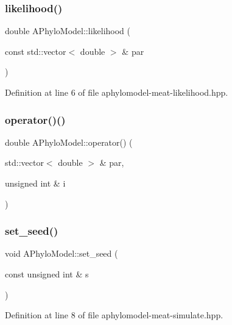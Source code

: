 \subsubsection{\texorpdfstring{likelihood()}{likelihood()}}
{\footnotesize\ttfamily double A\+Phylo\+Model\+::likelihood (\begin{DoxyParamCaption}\item[{const std\+::vector$<$ double $>$ \&}]{par }\end{DoxyParamCaption})}



Definition at line 6 of file aphylomodel-\/meat-\/likelihood.\+hpp.

\mbox{\label{class_a_phylo_model_a9b3390c29ea7a3283e68e9a059b94138}} 
\subsubsection{\texorpdfstring{operator()()}{operator()()}}
{\footnotesize\ttfamily double A\+Phylo\+Model\+::operator() (\begin{DoxyParamCaption}\item[{std\+::vector$<$ double $>$ \&}]{par,  }\item[{unsigned int \&}]{i }\end{DoxyParamCaption})}

\mbox{\label{class_a_phylo_model_a5f3faed4bad372764c056d1686508d6e}} 
\subsubsection{\texorpdfstring{set\+\_\+seed()}{set\_seed()}}
{\footnotesize\ttfamily void A\+Phylo\+Model\+::set\+\_\+seed (\begin{DoxyParamCaption}\item[{const unsigned int \&}]{s }\end{DoxyParamCaption})}



Definition at line 8 of file aphylomodel-\/meat-\/simulate.\+hpp.

\mbox{\label{class_a_phylo_model_ac75bb5a2f14d104733e2c194ae210986}} 
